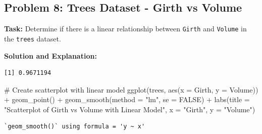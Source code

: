 \documentclass[
  letterpaper,
  DIV=11,
  numbers=noendperiod]{scrreprt}
\newenvironment{Shaded}{\begin{snugshade}}{\end{snugshade}}
\newcommand{\AttributeTok}[1]{\textcolor[rgb]{0.40,0.45,0.13}{#1}}
\newcommand{\CommentTok}[1]{\textcolor[rgb]{0.37,0.37,0.37}{#1}}
\newcommand{\ConstantTok}[1]{\textcolor[rgb]{0.56,0.35,0.01}{#1}}
\newcommand{\FunctionTok}[1]{\textcolor[rgb]{0.28,0.35,0.67}{#1}}
\newcommand{\NormalTok}[1]{\textcolor[rgb]{0.00,0.23,0.31}{#1}}
\newcommand{\OtherTok}[1]{\textcolor[rgb]{0.00,0.23,0.31}{#1}}
\newcommand{\SpecialCharTok}[1]{\textcolor[rgb]{0.37,0.37,0.37}{#1}}
\newcommand{\StringTok}[1]{\textcolor[rgb]{0.13,0.47,0.30}{#1}}
\begin{document}
\subsection*{Problem 8: Trees Dataset - Girth vs
Volume}\label{problem-8-trees-dataset---girth-vs-volume-1}

\textbf{Task:} Determine if there is a linear relationship between
\texttt{Girth} and \texttt{Volume} in the \texttt{trees} dataset.

\textbf{Solution and Explanation:}

\begin{Shaded}
\end{Shaded}

\begin{verbatim}
[1] 0.9671194
\end{verbatim}

\begin{Shaded}
\begin{Highlighting}[]
\CommentTok{\# Create scatterplot with linear model}
\FunctionTok{ggplot}\NormalTok{(trees, }\FunctionTok{aes}\NormalTok{(}\AttributeTok{x =}\NormalTok{ Girth, }\AttributeTok{y =}\NormalTok{ Volume)) }\SpecialCharTok{+}
  \FunctionTok{geom\_point}\NormalTok{() }\SpecialCharTok{+}
  \FunctionTok{geom\_smooth}\NormalTok{(}\AttributeTok{method =} \StringTok{"lm"}\NormalTok{, }\AttributeTok{se =} \ConstantTok{FALSE}\NormalTok{) }\SpecialCharTok{+}
  \FunctionTok{labs}\NormalTok{(}\AttributeTok{title =} \StringTok{"Scatterplot of Girth vs Volume with Linear Model"}\NormalTok{, }\AttributeTok{x =} \StringTok{"Girth"}\NormalTok{, }\AttributeTok{y =} \StringTok{"Volume"}\NormalTok{)}
\end{Highlighting}
\end{Shaded}

\begin{verbatim}
`geom_smooth()` using formula = 'y ~ x'
\end{verbatim}
\end{document}
